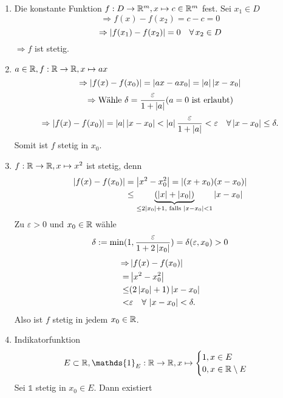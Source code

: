 \documentclass[../ana1.tex]{subfiles}
\begin{document}
\begin{bspe}\leavevmode
    \begin{enumerate}
        \item Die konstante Funktion \( f: D\rightarrow \mathbb{R}^m, 
        x\mapsto c\in\mathbb{R}^m \) fest.
        Sei \( x_1\in D \)
        \[ \Rightarrow f(x) - f(x_2) = c - c = 0 \]
        \[ \Rightarrow \left|f(x_1) - f(x_2)\right| = 0 \quad \forall \, 
        x_2\in D \]
        \(\Rightarrow f\) ist stetig.
        \item \( a\in\mathbb{R}, f:\mathbb{R} \rightarrow \mathbb{R}, x\mapsto ax \)
        \[ \Rightarrow \left| f(x) - f(x_0) \right| = 
        \left| ax - ax_0 \right| = \left|a\right|\left|x-x_0\right| \]
        \[ \Rightarrow \text{Wähle }\delta = 
        \frac{\varepsilon}{1+\left|a\right|} 
        (a=0 \text{ ist erlaubt}) \]
        \[ \Rightarrow \left|f(x) - f(x_0)\right| = \left|a\right|
        \left|x-x_0\right| < \left|a\right| \frac{\varepsilon}{1+\left|a\right|}
        < \varepsilon \quad \forall \left|x-x_0\right| \leq \delta. \]
        Somit ist \(f\) stetig in \(x_0\).
        \item \( f:\mathbb{R}\rightarrow\mathbb{R}, x\mapsto x^2 \)
        ist stetig, denn
        \begin{align*}
            \left| f(x) - f(x_0) \right| &= \left|x^2 - x_0^2\right| 
        = \left| (x+x_0)(x-x_0) \right|\\
            &\leq \underbrace{( \left|x\right| + \left|x_0\right| )}_{
                \leq 2\left|x_0\right|+1, \text{ falls } \left|x-x_0\right| < 1
            } \left|x-x_0\right|
        \end{align*}
        Zu \( \varepsilon > 0 \) und \( x_0 \in\mathbb{R} \) wähle
        \[ \delta := \min(1, \frac{\varepsilon}{1 + 2\left|x_0\right|})
        = \delta(\varepsilon, x_0) > 0 \]
        \begin{align*}
            \Rightarrow &\left| f(x) - f(x_0) \right|\\
            = &\left|x^2 - x_0^2\right|\\
            \leq &(2\left|x_0\right| + 1) \left|x-x_0\right|\\
            < &\varepsilon \quad \forall \, \left|x-x_0\right| < \delta.
        \end{align*}
        Also ist \(f\) stetig in jedem \( x_0\in\mathbb{R} \).
        \item Indikatorfunktion 
        \[ E\subset \R, 
        \mathds{1}_E : \R\rightarrow\R, x\mapsto 
        \begin{cases}
            1, x\in E\\
            0, x\in\R \setminus E
        \end{cases} \]
        Sei \( \mathds{1} \) stetig in \( x_0\in E \). Dann existiert

\end{enumerate}
\end{bspe}
\end{document}
